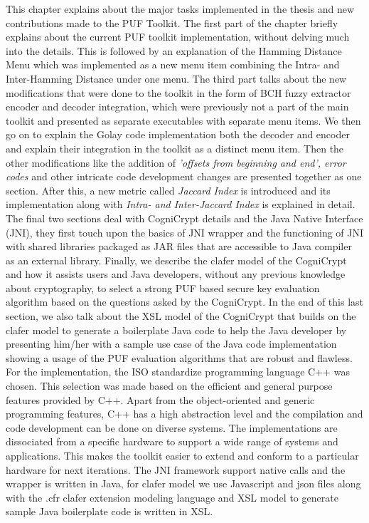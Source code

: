 This chapter explains about the major tasks implemented in the thesis and new contributions made to the PUF Toolkit. The first part of the chapter briefly explains about the current PUF toolkit implementation, without delving much into the details. This is followed by an explanation of the Hamming Distance Menu which was implemented as a new menu item combining the Intra- and Inter-Hamming Distance under one menu. The third part talks about the new modifications that were done to the toolkit in the form of BCH fuzzy extractor encoder and decoder integration, which were previously not a part of the main toolkit and presented as separate executables
with separate menu items. We then go on to explain the Golay code implementation both the decoder and encoder and explain their integration in the toolkit as a distinct menu item. Then the other modifications like the addition of \emph{'offsets from beginning and end', error codes} and other intricate code development changes are presented together as one section. After this, a new metric called \emph{Jaccard Index} is introduced and its implementation along with \emph{Intra- and
Inter-Jaccard Index} is explained in detail.\\

The final two sections deal with CogniCrypt details and the Java Native Interface (JNI), they first touch upon the basics of JNI
wrapper and the functioning of JNI with shared libraries packaged as JAR files that are accessible to Java compiler as an external library. Finally, we describe the clafer model of the CogniCrypt and how it assists users and Java developers, without any previous knowledge about cryptography, to select a strong PUF based secure key evaluation algorithm based on the questions asked by the CogniCrypt. In the end of this last section, we also talk about the XSL model of the CogniCrypt that builds on
the clafer model to generate a boilerplate Java code to help the Java developer by presenting him/her with a sample use case of the Java code implementation showing a usage of the PUF evaluation algorithms that are robust and flawless.\\

For the implementation, the ISO standardize programming language C++ was chosen. This selection was made based on the efficient and general purpose features provided by C++. Apart from the object-oriented and generic programming features, C++ has a high abstraction level and the compilation and code development can be done on diverse systems. The implementations are dissociated from a specific hardware to support a wide range of systems and applications. This makes the toolkit easier
to extend and conform to a particular hardware for next iterations. The JNI framework support native calls and the wrapper is written in Java, for clafer model we use Javascript and json files along with the .cfr clafer extension modeling language \cite{clafer} and XSL model to generate sample Java boilerplate code is written in XSL.\\

